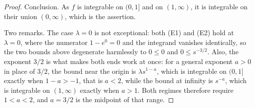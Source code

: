 \begin{proof}
Conclusion.  As $f$ is integrable on $(0,1]$ and on $(1,\infty)$, it is
integrable on their union $(0,\infty)$, which is the assertion.

Two remarks.  The case $\lambda = 0$ is not exceptional: both (E1) and (E2) hold
at $\lambda = 0$, where the numerator $1 - e^{0} = 0$ and the integrand vanishes
identically, so the two bounds above degenerate harmlessly to $0 \leq 0$ and
$0 \le s^{-3/2}$.  Also, the exponent $3/2$ is what makes both ends work at once:
for a general exponent $a > 0$ in place of $3/2$, the bound near the origin is
$\lambda s^{1-a}$, which is integrable on $(0,1]$ exactly when $1 - a > -1$, that
is $a < 2$, while the bound at infinity is $s^{-a}$, which is integrable on
$(1,\infty)$ exactly when $a > 1$.  Both regimes therefore require
$1 < a < 2$, and $a = 3/2$ is the midpoint of that range.
\end{proof}
